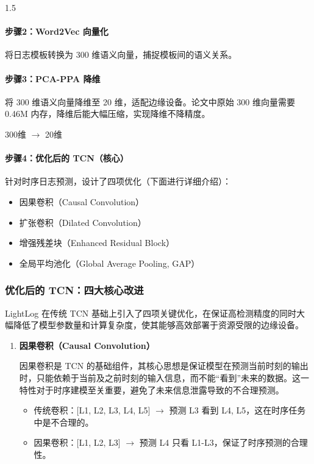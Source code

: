 \documentclass[a4paper,12pt]{report}
\begin{document}
\begin{spacing}{1.5}
\paragraph{步骤2：Word2Vec 向量化}
将日志模板转换为 300 维语义向量，捕捉模板间的语义关系。

\paragraph{步骤3：PCA-PPA 降维}
将 300 维语义向量降维至 20 维，适配边缘设备。论文中原始 300 维向量需要 0.46M 内存，降维后能大幅压缩，实现降维不降精度。
\begin{center}
300维 $\rightarrow$ 20维
\end{center}

\paragraph{步骤4：优化后的 TCN（核心）}
针对时序日志预测，设计了四项优化（下面进行详细介绍）：
\begin{itemize}
\item 因果卷积（Causal Convolution）
\item 扩张卷积（Dilated Convolution）
\item 增强残差块（Enhanced Residual Block）
\item 全局平均池化（Global Average Pooling, GAP）
\end{itemize}

\subsubsection{优化后的 TCN：四大核心改进}

LightLog 在传统 TCN 基础上引入了四项关键优化，在保证高检测精度的同时大幅降低了模型参数量和计算复杂度，使其能够高效部署于资源受限的边缘设备。

\begin{enumerate}
\item \textbf{因果卷积（Causal Convolution）}
    
因果卷积是 TCN 的基础组件，其核心思想是保证模型在预测当前时刻的输出时，只能依赖于当前及之前时刻的输入信息，而不能“看到”未来的数据。这一特性对于时序建模至关重要，避免了未来信息泄露导致的不合理预测。
\begin{itemize}
\item 传统卷积：[L1, L2, L3, L4, L5] $\rightarrow$ 预测 L3 看到 L4, L5，这在时序任务中是不合理的。
\item 因果卷积：[L1, L2, L3] $\rightarrow$ 预测 L4 只看 L1-L3，保证了时序预测的合理性。
\end{itemize}


\end{enumerate}
\end{spacing}
\end{document}
